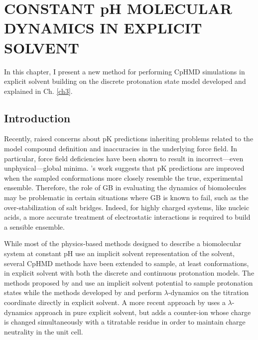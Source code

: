 \chapter{CONSTANT pH MOLECULAR DYNAMICS IN EXPLICIT SOLVENT}

In this chapter, I present a new method for performing CpHMD simulations in
explicit solvent building on the discrete protonation state model developed and
explained in Ch. \ref{ch3}.

\section{Introduction}

Recently, \citeauthor{Machuqueiro_Proteins_2011_v79_p3437} raised concerns about
pK predictions inheriting problems related to the model compound
definition and inaccuracies in the underlying force field.
\cite{Machuqueiro_Proteins_2011_v79_p3437} In particular, force field
deficiencies have been shown to result in incorrect---even unphysical---global
minima. \cite{Zgarbova_JChemTheoryComput_2011_v7_p2886,
Cheatham_Biopolymers_2001_v56_p232, Varnai_NucleicAcidsRes_2002_v30_p5398,
Hornak_Proteins_2006_v65_p712, Klepeis_CurrOpinStructBiol_2009_v19_p120}
\citeauthor{Machuqueiro_Proteins_2011_v79_p3437}'s work suggests that pK
predictions are improved when the sampled conformations more closely resemble
the true, experimental ensemble. Therefore, the role of GB in evaluating the
dynamics of biomolecules may be problematic in certain situations where GB is
known to fail, such as the over-stabilization of salt bridges.
\cite{Zhou_Proteins_2003_v53_p148, Geney_JChemTheoryComput_2006_v2_p115} Indeed,
for highly charged systems, like nucleic acids, a more accurate treatment of
electrostatic interactions is required to build a sensible ensemble.

While most of the physics-based methods designed to describe a biomolecular
system at constant pH use an implicit solvent representation of the solvent,
several CpHMD methods have been extended to sample, at least conformations, in
explicit solvent with both the discrete 
\cite{Baptista_JChemPhys_2002_v117_p4184} and continuous 
\cite{Donnini_JChemTheoryComput_2011_v7_p1962,
Wallace_JChemTheoryComput_2011_v7_p2617, Goh_JChemTheoryComput_2012_v8_p36}
protonation models.  The methods proposed by
\citeauthor{Baptista_JChemPhys_2002_v117_p4184}
\cite{Baptista_JChemPhys_2002_v117_p4184} and
\citeauthor{Wallace_JChemTheoryComput_2011_v7_p2617}
\cite{Wallace_JChemTheoryComput_2011_v7_p2617} use an implicit solvent
potential to sample protonation states while the methods developed by
\citeauthor{Goh_JChemTheoryComput_2012_v8_p36}
\cite{Goh_JChemTheoryComput_2012_v8_p36} and
\citeauthor{Donnini_JChemTheoryComput_2011_v7_p1962} 
\cite{Donnini_JChemTheoryComput_2011_v7_p1962} perform $\lambda$-dynamics on the
titration coordinate directly in explicit solvent. A more recent approach by
\citeauthor{Wallace_JChemPhys_2012_v137_p184105} uses a $\lambda$-dynamics
approach in pure explicit solvent, but adds a counter-ion whose charge is
changed simultaneously with a titratable residue in order to maintain charge
neutrality in the unit cell. \cite{Wallace_JChemPhys_2012_v137_p184105}

